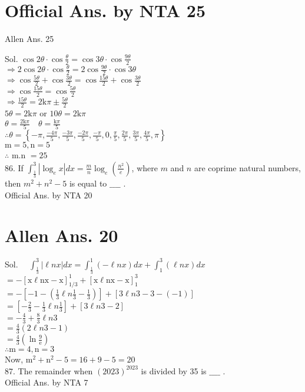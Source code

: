 \documentclass[10pt]{article}
\begin{document}
\section*{Official Ans. by NTA 25}
Allen Ans. 25

Sol. \(\cos 2 \theta \cdot \cos \frac{\theta}{2}=\cos 3 \theta \cdot \cos \frac{9 \theta}{2}\)\\
\(\Rightarrow 2 \cos 2 \theta \cdot \cos \frac{\theta}{2}=2 \cos \frac{9 \theta}{2} \cdot \cos 3 \theta\)\\
\(\Rightarrow \cos \frac{5 \theta}{2}+\cos \frac{3 \theta}{2}=\cos \frac{15 \theta}{2}+\cos \frac{3 \theta}{2}\)\\
\(\Rightarrow \cos \frac{15 \theta}{2}=\cos \frac{5 \theta}{2}\)\\
\(\Rightarrow \frac{15 \theta}{2}=2 \mathrm{k} \pi \pm \frac{5 \theta}{2}\)\\
\(5 \theta=2 \mathrm{k} \pi\) or \(10 \theta=2 \mathrm{k} \pi\)\\
\(\theta=\frac{2 \mathrm{k} \pi}{5} \quad \theta=\frac{\mathrm{k} \pi}{5}\)\\
\(\therefore \theta=\left\{-\pi, \frac{-4 \pi}{5}, \frac{-3 \pi}{5}, \frac{-2 \pi}{5}, \frac{-\pi}{5}, 0, \frac{\pi}{5}, \frac{2 \pi}{5}, \frac{3 \pi}{5}, \frac{4 \pi}{5}, \pi\right\}\)\\
\(\mathrm{m}=5, \mathrm{n}=5\)\\
\(\therefore\) m.n \(=25\)\\
86. If \(\int_{\frac{1}{3}}^{3}\left|\log _{e} x\right| d x=\frac{m}{n} \log _{e}\left(\frac{n^{2}}{e}\right)\), where \(m\) and \(n\) are coprime natural numbers, then \(m^{2}+n^{2}-5\) is equal to \(\_\_\_\_\) .\\
Official Ans. by NTA 20

\section*{Allen Ans. 20}
Sol. \(\quad \int_{\frac{1}{3}}^{3}|\ell n x| d x=\int_{\frac{1}{3}}^{1}(-\ell n x) d x+\int_{1}^{3}(\ell n x) d x\)\\
\(=-[\mathrm{x} \ell \mathrm{nx}-\mathrm{x}]_{1 / 3}^{1}+[\mathrm{x} \ell \mathrm{nx}-\mathrm{x}]_{1}^{3}\)\\
\(=-\left[-1-\left(\frac{1}{3} \ell n \frac{1}{3}-\frac{1}{3}\right)\right]+[3 \ell n 3-3-(-1)]\)\\
\(=\left[-\frac{2}{3}-\frac{1}{3} \ell n \frac{1}{3}\right]+[3 \ell n 3-2]\)\\
\(=-\frac{4}{3}+\frac{8}{3} \ell n 3\)\\
\(=\frac{4}{3}(2 \ell n 3-1)\)\\
\(=\frac{4}{3}\left(\ln \frac{9}{\mathrm{e}}\right)\)\\
\(\therefore \mathrm{m}=4, \mathrm{n}=3\)\\
Now, \(\mathrm{m}^{2}+\mathrm{n}^{2}-5=16+9-5=20\)\\
87. The remainder when \((2023)^{2023}\) is divided by 35 is \(\_\_\_\_\) .\\
Official Ans. by NTA 7
\end{document}
